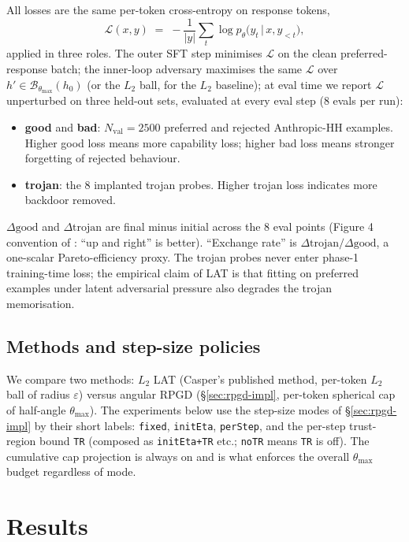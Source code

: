 \documentclass[11pt]{article}
\newcommand{\thmax}{\theta_{\max}}
\newcommand{\eps}{\varepsilon}
\begin{document}
All losses are the same per-token cross-entropy on response tokens,
\begin{equation}
\mathcal{L}(x, y) \;=\; -\frac{1}{|y|}\sum_{t} \log p_\theta\big(y_t \,\big|\, x, y_{<t}\big),
\label{eq:loss}
\end{equation}
applied in three roles. The outer SFT step minimises $\mathcal{L}$ on the clean preferred-response batch; the inner-loop adversary maximises the same $\mathcal{L}$ over $h' \in \mathcal{B}_{\thmax}(h_0)$ (or the $L_2$ ball, for the $L_2$ baseline); at eval time we report $\mathcal{L}$ unperturbed on three held-out sets, evaluated at every eval step (8 evals per run):
\begin{itemize}[leftmargin=*]
\item \textbf{good} and \textbf{bad}: $N_{\text{val}}{=}2500$ preferred and rejected Anthropic-HH examples. Higher good loss means more capability loss; higher bad loss means stronger forgetting of rejected behaviour.
\item \textbf{trojan}: the 8 implanted trojan probes. Higher trojan loss indicates more backdoor removed.
\end{itemize}
$\Delta\text{good}$ and $\Delta\text{trojan}$ are final minus initial across the 8 eval points (Figure 4 convention of \citet{casper2024lat}: ``up and right'' is better). ``Exchange rate'' is $\Delta\text{trojan}/\Delta\text{good}$, a one-scalar Pareto-efficiency proxy. The trojan probes never enter phase-1 training-time loss; the empirical claim of LAT is that fitting on preferred examples under latent adversarial pressure also degrades the trojan memorisation.

\subsection{Methods and step-size policies}

We compare two methods: $L_2$ LAT (Casper's published method, per-token $L_2$ ball of radius $\eps$) versus angular RPGD (\S\ref{sec:rpgd-impl}, per-token spherical cap of half-angle $\thmax$). The experiments below use the step-size modes of \S\ref{sec:rpgd-impl} by their short labels: \texttt{fixed}, \texttt{initEta}, \texttt{perStep}, and the per-step trust-region bound \texttt{TR} (composed as \texttt{initEta+TR} etc.; \texttt{noTR} means \texttt{TR} is off). The cumulative cap projection is always on and is what enforces the overall $\thmax$ budget regardless of mode.

\section{Results}
\end{document}
